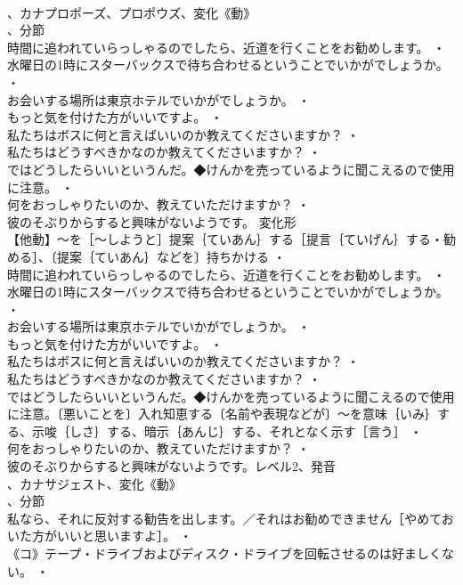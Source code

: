 \documentclass[8pt]{extreport}
\begin{document}
\begin{CJK}{UTF8}{min}
\\	、カナプロポーズ、プロポウズ、変化《動》
\\	、分節
\\	時間に追われていらっしゃるのでしたら、近道を行くことをお勧めします。 ・
\\	水曜日の1時にスターバックスで待ち合わせるということでいかがでしょうか。 ・
\\	お会いする場所は東京ホテルでいかがでしょうか。 ・
\\	もっと気を付けた方がいいですよ。 ・
\\	私たちはボスに何と言えばいいのか教えてくださいますか？ ・
\\	私たちはどうすべきかなのか教えてくださいますか？ ・
\\	ではどうしたらいいというんだ。◆けんかを売っているように聞こえるので使用に注意。 ・
\\	何をおっしゃりたいのか、教えていただけますか？ ・
\\	彼のそぶりからすると興味がないようです。	変化形 
\\	【他動】～を［～しようと］提案｛ていあん｝する［提言｛ていげん｝する・勧める］、〔提案｛ていあん｝などを〕持ちかける ・
\\	時間に追われていらっしゃるのでしたら、近道を行くことをお勧めします。 ・
\\	水曜日の1時にスターバックスで待ち合わせるということでいかがでしょうか。 ・
\\	お会いする場所は東京ホテルでいかがでしょうか。 ・
\\	もっと気を付けた方がいいですよ。 ・
\\	私たちはボスに何と言えばいいのか教えてくださいますか？ ・
\\	私たちはどうすべきかなのか教えてくださいますか？ ・
\\	ではどうしたらいいというんだ。◆けんかを売っているように聞こえるので使用に注意。〔悪いことを〕入れ知恵する〔名前や表現などが〕～を意味｛いみ｝する、示唆｛しさ｝する、暗示｛あんじ｝する、それとなく示す［言う］ ・
\\	何をおっしゃりたいのか、教えていただけますか？ ・
\\	彼のそぶりからすると興味がないようです。レベル2、発音
\\	、カナサジェスト、変化《動》
\\	、分節
\\	私なら、それに反対する勧告を出します。／それはお勧めできません［やめておいた方がいいと思いますよ］。 ・
\\	《コ》テープ・ドライブおよびディスク・ドライブを回転させるのは好ましくない。 ・

\end{CJK}
\end{document}
